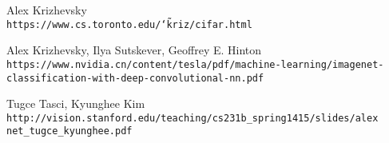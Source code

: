 \begin{thebibliography}{99}
Alex Krizhevsky
\\\texttt{https://www.cs.toronto.edu/\char`\~kriz/cifar.html}

Alex Krizhevsky, Ilya Sutskever, Geoffrey E. Hinton
\\\texttt{https://www.nvidia.cn/content/tesla/pdf/machine-learning/imagenet-\\classification-with-deep-convolutional-nn.pdf}

Tugce Tasci, Kyunghee Kim
\\\texttt{http://vision.stanford.edu/teaching/cs231b\_spring1415/slides/alex\\net\_tugce\_kyunghee.pdf}

\end{thebibliography}
